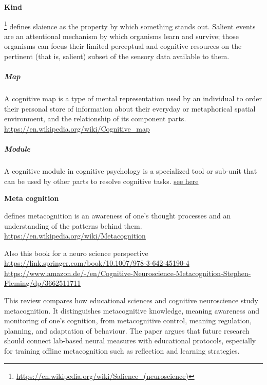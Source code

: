 \documentclass{book}
\newcommand{\seehere}[1]{\href{#1}{see here}}
\providecommand{\ProjectDeepHeading}[2]{%
    \par\medskip\noindent\textbf{#2}\par\smallskip
}
\providecommand{\seehere}[1]{\href{#1}{see here}}
\providecommand{\clickurlfooter}[1]{\footnote{\url{#1}}}
\begin{document}
\ProjectDeepHeading{1}{Kind}


\clickurlfooter{https://en.wikipedia.org/wiki/Salience_(neuroscience)} defines slaience as the property by which something stands out. Salient events are an attentional mechanism by which organisms learn and survive; those organisms can focus their limited perceptual and cognitive resources on the pertinent (that is, salient) subset of the sensory data available to them.

\subparagraph{Map}


A cognitive map is a type of mental representation used by an individual to order their personal store of information about their everyday or metaphorical spatial environment, and the relationship of its component parts. \url{https://en.wikipedia.org/wiki/Cognitive_map}

\subparagraph{Module}


A cognitive module in cognitive psychology is a specialized tool or sub-unit that can be used by other parts to resolve cognitive tasks. \seehere{https://en.wikipedia.org/wiki/Cognitive_module}

\ProjectDeepHeading{1}{Meta cognition}


\cite{metcalfe-1994-metacognition-knowing-about-knowing} defines metacognition is an awareness of one's thought processes and an understanding of the patterns behind them.
    \url{https://en.wikipedia.org/wiki/Metacognition}
    
    Also this book for a neuro science perspective
    \url{https://link.springer.com/book/10.1007/978-3-642-45190-4}
    \\
    \url{https://www.amazon.de/-/en/Cognitive-Neuroscience-Metacognition-Stephen-Fleming/dp/3662511711}
    
    \cite{fleur-2021-metacognition-ideas-and-insights-from-neuro-and-educational-sciences}
    This review compares how educational sciences and cognitive neuroscience study metacognition. It distinguishes metacognitive knowledge, meaning awareness and monitoring of one’s cognition, from metacognitive control, meaning regulation, planning, and adaptation of behaviour. The paper argues that future research should connect lab-based neural measures with educational protocols, especially for training offline metacognition such as reflection and learning strategies.
    
\end{document}

